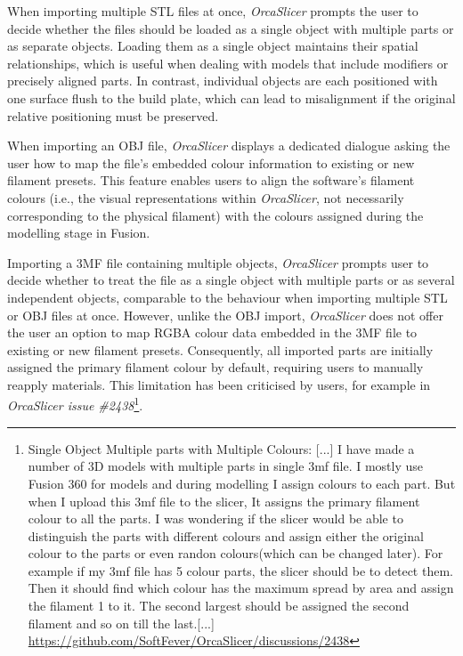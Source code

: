 When importing multiple STL files at once, \textit{OrcaSlicer} prompts the user to decide whether the files should be loaded as a single object with multiple parts or as separate objects.
Loading them as a single object maintains their spatial relationships, which is useful when dealing with models that include modifiers or precisely aligned parts.
In contrast, individual objects are each positioned with one surface flush to the build plate, which can lead to misalignment if the original relative positioning must be preserved.

When importing an OBJ file, \textit{OrcaSlicer} displays a dedicated dialogue asking the user how to map the file’s embedded colour information to existing or new filament presets.
This feature enables users to align the software’s filament colours (i.e., the visual representations within \textit{OrcaSlicer}, not necessarily corresponding to the physical filament) with the colours assigned during the modelling stage in Fusion.

Importing a 3MF file containing multiple objects, \textit{OrcaSlicer} prompts user to decide whether to treat the file as a single object with multiple parts or as several independent objects, comparable to the behaviour when importing multiple STL or OBJ files at once.
However, unlike the OBJ import, \textit{OrcaSlicer} does not offer the user an option to map RGBA colour data embedded in the 3MF file to existing or new filament presets.
Consequently, all imported parts are initially assigned the primary filament colour by default, requiring users to manually reapply materials.
This limitation has been criticised by users, for example in \textit{OrcaSlicer issue \#2438}\footnote{Single Object Multiple parts with Multiple Colours: [...] I have made a number of 3D models with multiple parts in single 3mf file. I mostly use Fusion 360 for models and during modelling I assign colours to each part. But when I upload this 3mf file to the slicer, It assigns the primary filament colour to all the parts. I was wondering if the slicer would be able to distinguish the parts with different colours and assign either the original colour to the parts or even randon colours(which can be changed later).
For example if my 3mf file has 5 colour parts, the slicer should be to detect them. Then it should find which colour has the maximum spread by area and assign the filament 1 to it. The second largest should be assigned the second filament and so on till the last.[...] \\ \url{https://github.com/SoftFever/OrcaSlicer/discussions/2438}}.

